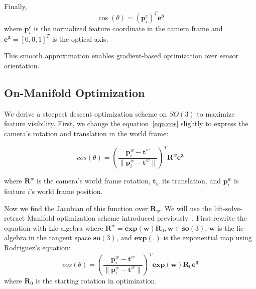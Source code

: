 \documentclass[letterpaper, 10 pt, conference]{ieeeconf}  %
\begin{document}
Finally,
\begin{equation}
\cos(\theta) = (\boldsymbol{p}_i^c)^T \boldsymbol{e^3}
\label{eqn:cos}
\end{equation}
where $\boldsymbol{p}_i^c$ is the normalized feature coordinate in the camera frame and $\boldsymbol{e^3} = [0,0,1]^T$ is the optical axis.

This smooth approximation enables gradient-based optimization over sensor orientation.

\subsection{On-Manifold Optimization}

We derive a steepest descent optimization scheme on $SO(3)$ to maximize feature visibility.
First, we change the equation~\ref{eqn:cos} slightly to express the camera's rotation and translation in the world frame:

\begin{equation}\label{eqn:cos_mod}
cos(\theta) =(\frac{\boldsymbol{p}_i^w - \boldsymbol{t}^w}{\|\boldsymbol{p}_i^w - \boldsymbol{t}^w\|})^T\boldsymbol{R}^{w}\boldsymbol{e^3}
\end{equation}

where $\boldsymbol{R}^{w}$ is the camera's world frame rotation, $\boldsymbol{t}_w$ its translation, and $\boldsymbol{p}_i^w$ is feature $i$'s world frame position.

Now we find the Jacobian of this function over $\boldsymbol{R}_{w}$. We will use the lift-solve-retract Manifold optimization scheme introduced previously~\cite{forster2015imu}. First rewrite the equation with Lie-algebra where $\boldsymbol{R}^{w}=\boldsymbol{exp}(\boldsymbol{w})\boldsymbol{R}_0, \boldsymbol{w} \in \boldsymbol{so}(3)$, $\boldsymbol{w}$ is the lie-algebra in the tangent space $\boldsymbol{so}(3)$, and $\boldsymbol{exp}(.)$ is the exponential map using Rodriguez's equation:
\begin{equation}
cos(\theta)=(\frac{\boldsymbol{p}_i^w - \boldsymbol{t}^w}{\|\boldsymbol{p}_i^w - \boldsymbol{t}^w\|})^T\boldsymbol{exp}(\boldsymbol{w})\boldsymbol{R}_0\boldsymbol{e^3}
\label{eqn:cos_mod_lie}
\end{equation}
where $\boldsymbol{R}_0$ is the starting rotation in optimization.
\end{document}
